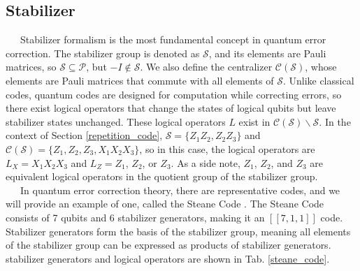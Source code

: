 \documentclass[a4paper,11pt]{ltjsarticle}
\begin{document}
{{        \subsection{Stabilizer}{
            \ \ \ Stabilizer formalism is the most fundamental concept in quantum error correction. The stabilizer group is denoted as $\mathcal{S}$, and its elements are Pauli matrices, so $\mathcal{S} \subseteq \mathcal{P}$, but $-I \not\in \mathcal{S}$. We also define the centralizer $\mathcal{C(S)}$, whose elements are Pauli matrices that commute with all elements of $\mathcal{S}$. Unlike classical codes, quantum codes are designed for computation while correcting errors, so there exist logical operators that change the states of logical qubits but leave stabilizer states unchanged. These logical operators $L$ exist in $\mathcal{C(S)} \backslash \mathcal{S}$. In the context of Section \ref{repetition_code}, $\mathcal{S} = \{Z_1Z_2, Z_2Z_3\}$ and $\mathcal{C(S)} = \{Z_1, Z_2, Z_3, X_1X_2X_3\}$, so in this case, the logical operators are $L_X = X_1X_2X_3$ and $L_Z = Z_1$, $Z_2$, or $Z_3$. As a side note, $Z_1$, $Z_2$, and $Z_3$ are equivalent logical operators in the quotient group of the stabilizer group.\\
            \ \ \ In quantum error correction theory, there are representative codes, and we will provide an example of one, called the Steane Code \cite{steane1996}. The Steane Code consists of 7 qubits and 6 stabilizer generators, making it an $[[7, 1, 1]]$ code. Stabilizer generators form the basis of the stabilizer group, meaning all elements of the stabilizer group can be expressed as products of stabilizer generators. stabilizer generators and logical operators are shown in Tab. \ref{steane_code}.

}}}
\end{document}

